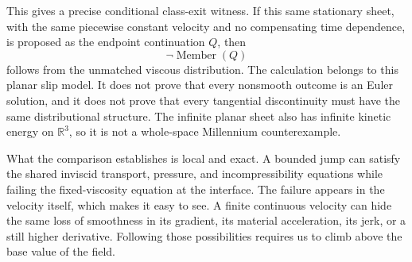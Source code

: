 This gives a precise conditional class-exit witness.
If this same stationary sheet, with the same piecewise constant velocity and no compensating time dependence, is proposed as the endpoint continuation \(Q\), then
\[
  \neg\operatorname{Member}(Q)
\]
follows from the unmatched viscous distribution.
The calculation belongs to this planar slip model.
It does not prove that every nonsmooth outcome is an Euler solution, and it does not prove that every tangential discontinuity must have the same distributional structure.
The infinite planar sheet also has infinite kinetic energy on \(\mathbb R^3\), so it is not a whole-space Millennium counterexample.

What the comparison establishes is local and exact.
A bounded jump can satisfy the shared inviscid transport, pressure, and incompressibility equations while failing the fixed-viscosity equation at the interface.
The failure appears in the velocity itself, which makes it easy to see.
A finite continuous velocity can hide the same loss of smoothness in its gradient, its material acceleration, its jerk, or a still higher derivative.
Following those possibilities requires us to climb above the base value of the field.

